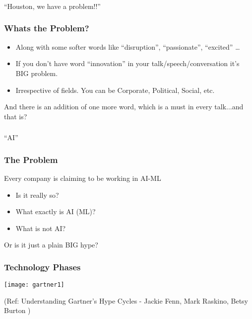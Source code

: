 \begin{frame}[fragile]\frametitle{}
\begin{center}
{\Large ``Houston, we have a problem!!''}
\end{center}
\end{frame}

\begin{frame}[fragile]\frametitle{Whats the Problem?}
\begin{itemize}
\item Along with some softer words like ``disruption'', ``passionate'', ``excited'' \ldots
\item If you don't have word ``innovation'' in your talk/speech/conversation it's  BIG problem. 
\item Irrespective of fields. You can be Corporate, Political, Social, etc.
\end{itemize}


And there is an addition of one more word,  which is a must in every talk...and that is?


\end{frame}

\begin{frame}[fragile]\frametitle{}
\begin{center}
{\Large ``AI''}
\end{center}
\end{frame}


\begin{frame}[fragile]\frametitle{The Problem}
Every company is claiming to be working in AI-ML
\begin{itemize}
\item Is it really so?
\item What exactly is AI (ML)?
\item What is not AI?
\end{itemize}
Or is it just a plain BIG hype?
\end{frame}


\begin{frame}[fragile]\frametitle{Technology Phases}
\begin{center}
\texttt{[image: gartner1]}
\end{center}
{\tiny (Ref: Understanding Gartner's Hype Cycles - Jackie Fenn, Mark Raskino, Betsy Burton )}
\end{frame}

